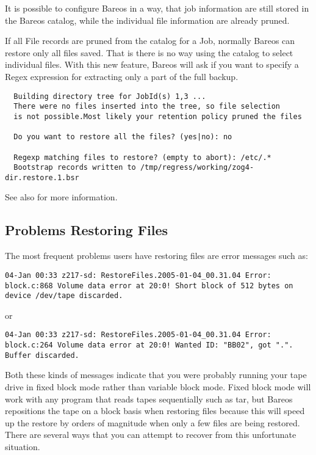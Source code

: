   It is possible to configure Bareos in a way,
  that job information are still stored in the Bareos catalog,
  while the individual file information are already pruned.

  If all File records are pruned from the catalog
  for a Job, normally Bareos can restore only all files saved. That
  is there is no way using the catalog to select individual files.
  With this new feature, Bareos will ask if you want to specify a Regex
  expression for extracting only a part of the full backup.

\begin{verbatim}
  Building directory tree for JobId(s) 1,3 ...
  There were no files inserted into the tree, so file selection
  is not possible.Most likely your retention policy pruned the files

  Do you want to restore all the files? (yes|no): no

  Regexp matching files to restore? (empty to abort): /etc/.*
  Bootstrap records written to /tmp/regress/working/zog4-dir.restore.1.bsr
\end{verbatim}

  See also  for more information.


\subsection{Problems Restoring Files}


The most frequent problems users have restoring files are error messages such
as:

\footnotesize
\begin{verbatim}
04-Jan 00:33 z217-sd: RestoreFiles.2005-01-04_00.31.04 Error:
block.c:868 Volume data error at 20:0! Short block of 512 bytes on
device /dev/tape discarded.
\end{verbatim}
\normalsize

or

\footnotesize
\begin{verbatim}
04-Jan 00:33 z217-sd: RestoreFiles.2005-01-04_00.31.04 Error:
block.c:264 Volume data error at 20:0! Wanted ID: "BB02", got ".".
Buffer discarded.
\end{verbatim}
\normalsize

Both these kinds of messages indicate that you were probably running your tape
drive in fixed block mode rather than variable block mode. Fixed block mode
will work with any program that reads tapes sequentially such as tar, but
Bareos repositions the tape on a block basis when restoring files because this
will speed up the restore by orders of magnitude when only a few files are being
restored. There are several ways that you can attempt to recover from this
unfortunate situation.


